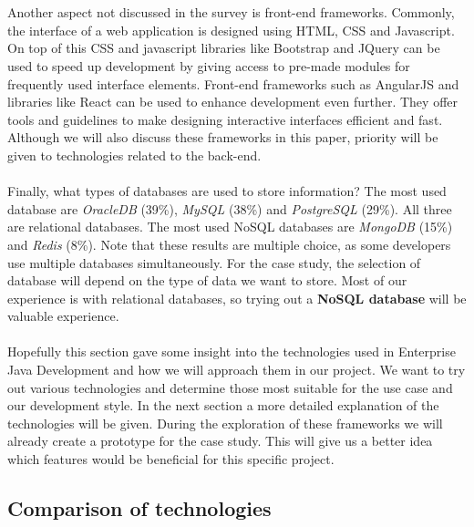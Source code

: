 \documentclass[12pt]{article}
\begin{document}
\begin{multicols}{2}
\\\\
Another aspect not discussed in the survey is front-end frameworks. Commonly, the interface of a web application is designed using HTML, CSS and Javascript. On top of this CSS and javascript libraries like Bootstrap and JQuery can be used to speed up development by giving access to pre-made modules for frequently used interface elements. Front-end frameworks such as AngularJS and libraries like React can be used to enhance development even further. They offer tools and guidelines to make designing interactive interfaces efficient and fast. Although we will also discuss these frameworks in this paper, priority will be given to technologies related to the back-end.
\\\\
Finally, what types of databases are used to store information? The most used database are \textit{OracleDB} (39\%), \textit{MySQL} (38\%) and \textit{PostgreSQL} (29\%). All three are relational databases. The most used NoSQL databases are \textit{MongoDB} (15\%) and \textit{Redis} (8\%). Note that these results are multiple choice, as some developers use multiple databases simultaneously. For the case study, the selection of database will depend on the type of data we want to store. Most of our experience is with relational databases, so trying out a \textbf{NoSQL database} will be valuable experience.
\\\\
Hopefully this section gave some insight into the technologies used in Enterprise Java Development and how we will approach them in our project. We want to try out various technologies and determine those most suitable for the use case and our development style. In the next section a more detailed explanation of the technologies will be given. During the exploration of these frameworks we will already create a prototype for the case study. This will give us a better idea which features would be beneficial for this specific project.


\subsection{Comparison of technologies}\label{sec:comparison}


\end{multicols}
\end{document}
